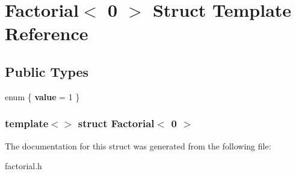 \hypertarget{structFactorial_3_010_01_4}{
\section{\-Factorial$<$ 0 $>$ \-Struct \-Template \-Reference}
\label{structFactorial_3_010_01_4}
}
\subsection*{\-Public \-Types}
\begin{DoxyCompactItemize}
\item 
enum \{ {\bfseries value} =  1
 \}
\end{DoxyCompactItemize}
\subsubsection*{template$<$$>$ struct Factorial$<$ 0 $>$}



\-The documentation for this struct was generated from the following file\-:\begin{DoxyCompactItemize}
\item 
factorial.\-h\end{DoxyCompactItemize}
